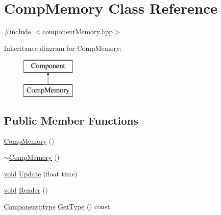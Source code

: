 \hypertarget{class_comp_memory}{\section{Comp\-Memory Class Reference}
\label{class_comp_memory}
}


{\ttfamily \#include $<$component\-Memory.\-hpp$>$}

Inheritance diagram for Comp\-Memory\-:\begin{figure}[H]
\begin{center}
\leavevmode
\includegraphics[height=2.000000cm]{class_comp_memory}
\end{center}
\end{figure}
\subsection*{Public Member Functions}
\begin{DoxyCompactItemize}
\item 
\hyperlink{class_comp_memory_a52c20a508512312f33175e89b1ca565f}{Comp\-Memory} ()
\item 
\hyperlink{class_comp_memory_ae9755d1c9212d9d0c4978fe29d70c3dd}{$\sim$\-Comp\-Memory} ()
\item 
\hyperlink{_s_d_l__opengles2__gl2ext_8h_ae5d8fa23ad07c48bb609509eae494c95}{void} \hyperlink{class_comp_memory_aa5ade8164c2bd2cea6f36b4d8c307cbb}{Update} (float time)
\item 
\hyperlink{_s_d_l__opengles2__gl2ext_8h_ae5d8fa23ad07c48bb609509eae494c95}{void} \hyperlink{class_comp_memory_a327e5e6a1abac3d72c32f85b99baf592}{Render} ()
\item 
\hyperlink{class_component_ad6d161b6acf7b843b55bb9feac7af71a}{Component\-::type} \hyperlink{class_comp_memory_abb43c1384fa0f909e590fbe11d855a72}{Get\-Type} () const 
\end{DoxyCompactItemize}
